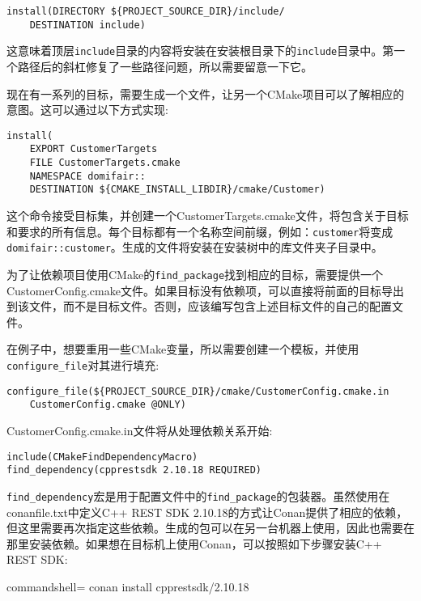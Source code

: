 \begin{lstlisting}[style=styleCMake]
install(DIRECTORY ${PROJECT_SOURCE_DIR}/include/
	DESTINATION include)
\end{lstlisting}

这意味着顶层\texttt{include}目录的内容将安装在安装根目录下的\texttt{include}目录中。第一个路径后的斜杠修复了一些路径问题，所以需要留意一下它。

现在有一系列的目标，需要生成一个文件，让另一个CMake项目可以了解相应的意图。这可以通过以下方式实现:

\begin{lstlisting}[style=styleCMake]
install(
	EXPORT CustomerTargets
	FILE CustomerTargets.cmake
	NAMESPACE domifair::
	DESTINATION ${CMAKE_INSTALL_LIBDIR}/cmake/Customer)
\end{lstlisting}

这个命令接受目标集，并创建一个CustomerTargets.cmake文件，将包含关于目标和要求的所有信息。每个目标都有一个名称空间前缀，例如：\texttt{customer}将变成\texttt{domifair::customer}。生成的文件将安装在安装树中的库文件夹子目录中。

为了让依赖项目使用CMake的\texttt{find\_package}找到相应的目标，需要提供一个CustomerConfig.cmake文件。如果目标没有依赖项，可以直接将前面的目标导出到该文件，而不是目标文件。否则，应该编写包含上述目标文件的自己的配置文件。

在例子中，想要重用一些CMake变量，所以需要创建一个模板，并使用\texttt{configure\_file}对其进行填充:

\begin{lstlisting}[style=styleCMake]
configure_file(${PROJECT_SOURCE_DIR}/cmake/CustomerConfig.cmake.in
	CustomerConfig.cmake @ONLY)
\end{lstlisting}

CustomerConfig.cmake.in文件将从处理依赖关系开始:

\begin{lstlisting}[style=styleCMake]
include(CMakeFindDependencyMacro)
find_dependency(cpprestsdk 2.10.18 REQUIRED)
\end{lstlisting}

\texttt{find\_dependency}宏是用于配置文件中的\texttt{find\_package}的包装器。虽然使用在conanfile.txt中定义C++ REST SDK 2.10.18的方式让Conan提供了相应的依赖，但这里需要再次指定这些依赖。生成的包可以在另一台机器上使用，因此也需要在那里安装依赖。如果想在目标机上使用Conan，可以按照如下步骤安装C++ REST SDK:

\begin{tcblisting}{commandshell={}}
conan install cpprestsdk/2.10.18
\end{tcblisting}


